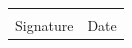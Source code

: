 \documentclass{tufte-book} %
\begin{document}
\vspace{0.25in}
\begin{tabular}{@{}p{3in}p{1in}@{}}
\hrulefill & \hrulefill \\
Signature & Date\\
\end{tabular}













\end{document}

